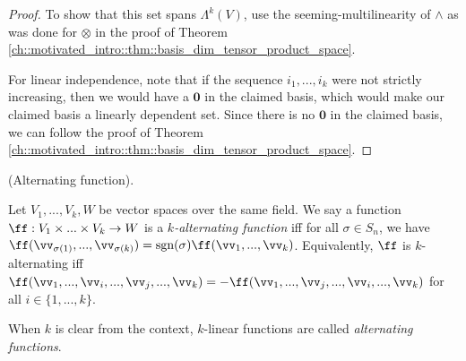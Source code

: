 \begin{proof}
   To show that this set spans $\Lambda^k(V)$, use the seeming-multilinearity of $\wedge$ as was done for $\otimes$ in the proof of Theorem \ref{ch::motivated_intro::thm::basis_dim_tensor_product_space}.
   
   For linear independence, note that if the sequence $i_1, ..., i_k$ were not strictly increasing, then we would have a $\mathbf{0}$ in the claimed basis, which would make our claimed basis a linearly dependent set. Since there is no $\mathbf{0}$ in the claimed basis, we can follow the proof of Theorem \ref{ch::motivated_intro::thm::basis_dim_tensor_product_space}.
\end{proof}


\begin{defn}
    (Alternating function).
    
    Let $V_1, ..., V_k, W$ be vector spaces over the same field. We say a function $\ff:V_1 \times ... \times V_k \rightarrow W$ is a \textit{$k$-alternating function} iff for all $\sigma \in S_n$, we have $\ff(\vv_{\sigma(1)}, ..., \vv_{\sigma(k)}) = \sgn(\sigma) \ff(\vv_1, ..., \vv_k)$. Equivalently, $\ff$ is $k$-alternating iff $\ff(\vv_1, ..., \vv_i, ..., \vv_j, ..., \vv_k) = -\ff(\vv_1, ..., \vv_j, ..., \vv_i, ..., \vv_k)$ for all $i \in \{1, ..., k\}$.
    
    When $k$ is clear from the context, $k$-linear functions are called \textit{alternating functions}.
\end{defn}

